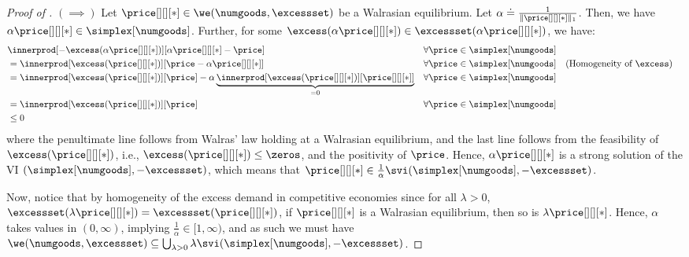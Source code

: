 \thmwecompequalsvi*
\begin{proof}[Proof of ]
    $(\implies)$
    Let $\price[][][*] \in \we(\numgoods, \excessset)$ be a Walrasian equilibrium. Let $\alpha \doteq \frac{1}{\|\price[][][*]\|_1}$. Then, we have $\alpha \price[][][*] \in \simplex[\numgoods]$. Further, for some $\excess(\alpha \price[][][*]) \in \excessset(\alpha \price[][][*])$, we have:
    \begin{align*}
        &\innerprod[{-\excess(\alpha\price[][][*])}][{\alpha\price[][][*] - \price}] && \forall \price \in \simplex[\numgoods]\\
        &= \innerprod[{\excess(\price[][][*])}][{\price - \alpha\price[][][*]}] && \forall \price \in \simplex[\numgoods] && \text{(Homogeneity of $\excess$)}\\
        &= \innerprod[{\excess(\price[][][*])}][{\price}] - \alpha \underbrace{\innerprod[{\excess(\price[][][*])}][{\price[][][*] }]}_{= 0} && \forall \price \in \simplex[\numgoods]\\
        &= \innerprod[{\excess(\price[][][*])}][{\price}]  && \forall \price \in \simplex[\numgoods]\\
        &\leq 0
    \end{align*}
    where the penultimate line follows from Walras' law holding at a Walrasian equilibrium, and the last line follows from the feasibility of $\excess(\price[][][*])$, i.e., $\excess(\price[][][*]) \leq \zeros$, and the positivity of $\price$. Hence, $\alpha \price[][][*]$ is a strong solution of the VI $(\simplex[\numgoods], - \excessset)$, which means that $\price[][][*] \in \frac{1}{\alpha} \svi(\simplex[\numgoods], - \excessset)$.
    
    Now, notice that by homogeneity of the excess demand in competitive economies since for all $\lambda > 0$, $\excessset(\lambda \price[][][*]) = \excessset(\price[][][*])$, if $\price[][][*]$ is a Walrasian equilibrium, then so is $\lambda \price[][][*]$. Hence, $\alpha$ takes values in $(0, \infty)$, implying $\frac{1}{\alpha} \in [1, \infty)$, and as such we must have $\we(\numgoods, \excessset) \subseteq  \bigcup_{\lambda > 0} \lambda \svi(\simplex[\numgoods], -\excessset)$.
    

\end{proof}
